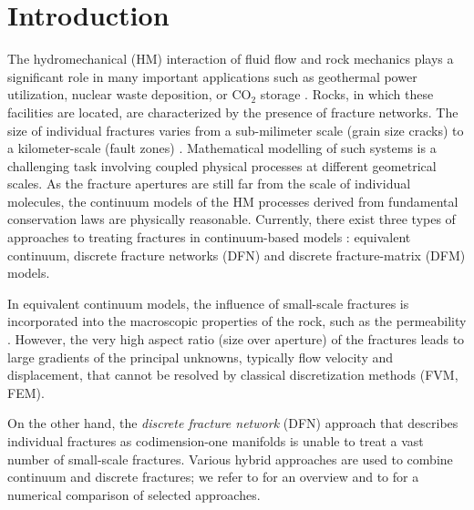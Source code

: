 \documentclass[a4paper]{article}
\numberwithin{equation}{section}
\begin{document}
\section{Introduction}
The hydromechanical (HM) interaction of fluid flow and rock mechanics plays a significant role in many important applications such as geothermal power utilization, nuclear waste deposition, or CO${}_2$ storage \cite{rutqvist2003role}.
Rocks, in which these facilities are located, are characterized by the presence of fracture networks. The size of individual fractures varies from a sub-milimeter scale (grain size cracks) to a kilometer-scale (fault zones) \cite{Bonnet2001}.
Mathematical modelling of such systems is a challenging task involving coupled physical processes at different geometrical scales.
As the fracture apertures are still far from the scale of individual molecules, the continuum models of the HM processes derived from fundamental conservation laws are physically reasonable.
Currently, there exist three types of approaches to treating fractures in continuum-based models \cite{berre2019flow}: equivalent continuum, discrete fracture networks (DFN) and discrete fracture-matrix (DFM) models.

In equivalent continuum models, the influence of small-scale fractures is incorporated into the macroscopic properties of the rock, such as the permeability \cite{Oda1986,Rutqvist2013a}. However, the very high aspect ratio (size over aperture) of the fractures leads to large gradients of the principal unknowns, typically flow velocity and displacement, that cannot be resolved by classical discretization methods (FVM, FEM).
 
On the other hand, the \textit{discrete fracture network} (DFN) approach \cite{Follin2014methodology,Hyman2015dfnWorks} that describes individual fractures as codimension-one manifolds is unable to treat a vast number of small-scale fractures. Various hybrid approaches are used to combine continuum and discrete fractures; we refer to \cite{Jing2002} for an overview and to \cite{Zhao2013Impact} for a numerical comparison of selected approaches.
\end{document}
